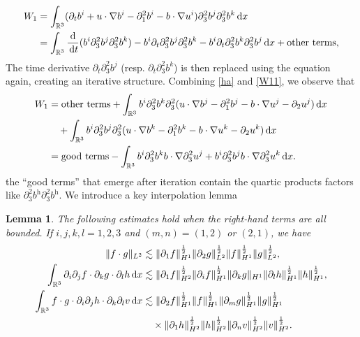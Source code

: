 \documentclass[11pt]{amsart}
\newtheorem{lem}[thm]{Lemma}
\theoremstyle{definition}
\newcommand{\R}{\mathbb{R}}
\newcommand{\dx}{\,{\rm d}x}
\newcommand{\dt}{\,{\rm d}t}
\numberwithin{equation}{section}
\begin{document}
\begin{align}\label{W11}
	W_1&=\int_{\R^3}({\partial_t}b^i+u\cdot\nabla{b}^i-\partial_1^2b^i -b\cdot\nabla{u}^i)\partial_3^2b^j\partial_3^2b^k\dx \nonumber\\
	&=\int_{\R^3}\frac{\mathrm{d}}{\dt}(b^i\partial_3^2b^j\partial_3^2b^k)-b^i\partial_t\partial_3^2b^j\partial_3^2b^k-b^i\partial_t\partial_3^2b^k\partial_3^2b^j\dx +\text{other terms},
\end{align}
The time derivative $\partial_t\partial_3^2 b^j$ (resp. $\partial_t\partial_3^2 b^k$) is then replaced using the equation again, creating an iterative structure. Combining \eqref{ha} and \eqref{W11}, we observe that
\begin{align}\label{W111}
	W_1&=\text{other terms}+\int_{\R^3} b^i\partial_3^2b^k\partial_3^2(u\cdot\nabla{b}^j-\partial_1^2b^j -b\cdot\nabla{u}^j-\partial_2u^j)\dx\nonumber\\
	&\quad+\int_{\R^3} b^i\partial_3^2b^j\partial_3^2(u\cdot\nabla{b}^k-\partial_1^2b^k -b\cdot\nabla{u}^k-\partial_2u^k)\dx\nonumber\\
	&=\text{good terms}-\int_{\R^3} b^i\partial_3^2b^k b\cdot\nabla\partial_3^2u^j+b^i\partial_3^2b^jb\cdot\nabla\partial_3^2u^k\dx.
\end{align}
the ``good terms'' that emerge after iteration contain the quartic products factors like $\partial_3^2 b^\mathrm{h} \partial_3^2 b^\mathrm{h}$. We introduce a key interpolation lemma
\begin{lem}\label{tool}
	The following estimates hold when the right-hand terms are all bounded. If $i,j,k,l=1,2,3$ and $(m,n)=(1,2)$ or $(2,1)$, we have
	\begin{align} \label{yi}
		\|f\cdot g\|_{L^2}&\lesssim\|\partial_1 f\|_{H^1}^\frac12\|\partial_2 g\|_{L^2}^\frac12\|f\|_{H^1}^\frac12\|g\|_{L^2}^\frac12,\\
		\label{er}\int_{\R^3}\partial_i\partial_jf\cdot\partial_kg\cdot\partial_lh\dx&\lesssim\|\partial_1f\|_{H^2}^\frac12\|\partial_if\|_{H^1}^\frac12\|\partial_kg\|_{H^1}\|\partial_lh\|_{H^1}^\frac12\|h\|_{H^1}^\frac12,\\\label{san}
		\int_{\R^3}f\cdot g\cdot\partial_i\partial_jh\cdot\partial_k\partial_lv\dx&\lesssim\|\partial_2f\|_{H^1}^\frac12\|f\|_{H^1}^\frac12\|\partial_mg\|_{H^1}^\frac12\|g\|_{H^1}^\frac12\nonumber\\
		&\quad \times\|\partial_1h\|_{H^2}^\frac12\|h\|_{H^2}^\frac12\|\partial_nv\|_{H^2}^\frac12\|v\|_{H^2}^\frac12.
	\end{align}
\end{lem}
\end{document}
